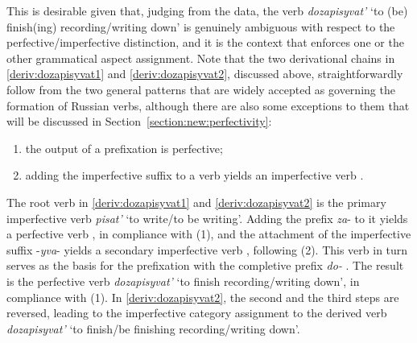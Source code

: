 This is desirable given that, judging from the data, the verb \textit{dozapisyvat'} `to (be) finish(ing) recording/writing down' is genuinely ambiguous with respect to the perfective/imperfective distinction, and it is the context   that enforces one or the other grammatical aspect assignment. Note that the two derivational chains in \ref{deriv:dozapisyvat1} and \ref{deriv:dozapisyvat2}, discussed above, straightforwardly follow from the two general patterns that are widely accepted as governing the formation of Russian verbs, although there are also some exceptions to them that will be discussed in Section~\ref{section:new:perfectivity}:

\begin{enumerate}
\item the output of a prefixation  is perfective;   
\item adding the imperfective suffix   to a verb yields an imperfective verb . 
\end{enumerate}

The root verb in \ref{deriv:dozapisyvat1} and \ref{deriv:dozapisyvat2} is the primary imperfective verb  \textit{pisat'} `to write/to be writing'. Adding the prefix \textit{za}- to it yields a perfective verb , in compliance with (1), and the attachment of the imperfective suffix   -\textit{yva}- yields a secondary imperfective  verb , following (2). This verb in turn serves as the basis for the prefixation  with the completive  prefix \textit{do-}  . The result is the perfective verb  \textit{dozapisyvat'} `to finish recording/writing down', in compliance with (1).  In \ref{deriv:dozapisyvat2}, the second and the third steps are reversed, leading to the imperfective category assignment to the derived verb \textit{dozapisyvat'} `to finish/be finishing recording/writing down'.

